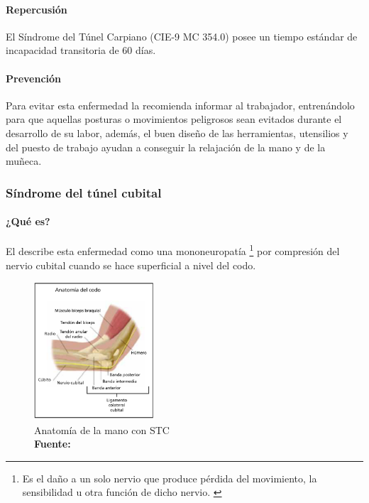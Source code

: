 \paragraph{Repercusión}
El Síndrome del Túnel Carpiano (CIE-9 MC 354.0) posee un tiempo estándar de incapacidad transitoria de 60 días\parencite[6]{INSHT2017SindromeCarpiano}.
\paragraph{Prevención}
Para evitar esta enfermedad la \parencite{FundacionSantaFedeBogota2016SindromeTratarlo} recomienda informar al trabajador, entrenándolo para que aquellas posturas o movimientos peligrosos sean evitados durante el desarrollo de su labor, además, el buen diseño de las herramientas, utensilios y del puesto de trabajo ayudan a conseguir la relajación de la mano y de la muñeca.

\subsubsection{Síndrome del túnel cubital}
\paragraph{¿Qué es?}
El \parencite[1]{INSHT2017SindromeCodo} describe esta enfermedad como una mononeuropatía \footnote{Es el daño a un solo nervio que produce pérdida del movimiento, la sensibilidad u otra función de dicho nervio. \parencite{MedlinePlus2018Mononeuropatia}} por compresión del nervio cubital cuando se hace superficial a nivel del codo.
\begin{figure}[H]
    \centering
    \includegraphics[width=0.4\textwidth]{Anexos/LATEX/chapters/images/AnaCodo.png}
    \caption{Anatomía de la mano con STC \\\textbf{Fuente:} \parencite[1]{INSHT2017SindromeCodo}}
    \label{AnaCodo}
\end{figure}
